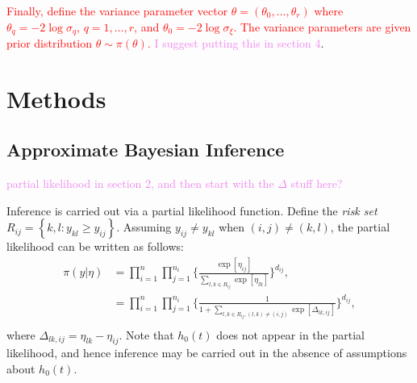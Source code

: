 \documentclass[ba]{imsart}
\newcommand{\highlight}[1]{\textcolor{red}{#1}}
\newcommand{\alex}[1]{\textcolor{violet}{{ }#1}}
\begin{document}
\highlight{Finally, define the variance parameter vector $\theta = (\theta_{0},\ldots,\theta_{r})$ where $\theta_{q} = -2\log\sigma_{q}$, $q = 1,\ldots,r$, and $\theta_{0} = -2\log\sigma_{\xi}$. The variance parameters are given prior distribution $\theta \sim \pi(\theta)$.}\alex{I suggest putting this in section 4}.

\section{Methods}\label{sec:method}


\subsection{Approximate Bayesian Inference}
\alex{partial likelihood in section 2, and then start with the $\Delta$ stuff here?}

Inference is carried out via a partial likelihood function. Define the \textit{risk set} $R_{ij} = \left\{k,l : y_{kl} \geq y_{ij}\right\}$. Assuming $y_{ij} \neq y_{kl}$ when $(i,j) \neq (k,l)$, the partial likelihood can be written as follows: 
\begin{equation}\begin{aligned}\label{eqn:partial}
\pi(y|\eta) &= \prod_{i=1}^{n}\prod_{j=1}^{n_{i}} \bigg\{\frac{\exp[\eta_{ij}]}{{\sum_{l,k\in R_{ij}}^{}\exp[\eta_{lk}]}}\bigg \}^{d_{ij}} , \\
&= \prod_{i=1}^{n}\prod_{j=1}^{n_{i}} \bigg\{\frac{1}{{1 + \sum_{l,k\in R_{ij} , (l,k) \neq (i,j)}\exp[\Delta_{lk,ij}]}}\bigg \}^{d_{ij}} , \\
\end{aligned}\end{equation}
where $\Delta_{lk,ij} = \eta_{lk} - \eta_{ij}$. Note that $h_{0}(t)$ does not appear in the partial likelihood, and hence inference may be carried out in the absence of assumptions about $h_{0}(t)$. 
\end{document}
